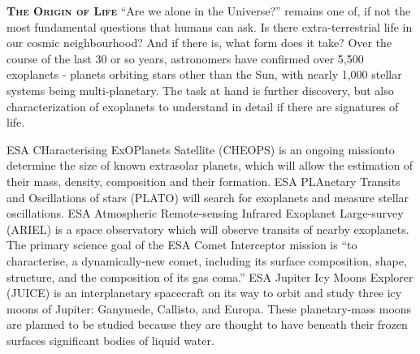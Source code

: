 \documentclass[a4paper,12pt]{article}
\begin{document}
\smallskip
\smallskip
\noindent
{\bfseries \textsc{\textcolor{Cerulean}{The Origin of Life}}}
``Are we alone in the Universe?'' remains one of, if not the most fundamental
questions that humans can ask. Is there
extra-terrestrial life in our cosmic neighbourhood? And if there is,
what form does it take?  Over the course of the last 30 or so years,
astronomers have confirmed over 5,500 exoplanets - planets orbiting
stars other than the Sun, with nearly 1,000 stellar systems being
multi-planetary.  The task at hand is further discovery, but also
characterization of exoplanets to understand in detail if there are
signatures of life.

\smallskip
ESA CHaracterising ExOPlanets Satellite (CHEOPS) is an ongoing missionto determine the size of known extrasolar planets, which will allow the estimation of their mass, density, composition and their formation. 
ESA PLAnetary Transits and Oscillations of stars (PLATO) will search
for exoplanets and measure stellar oscillations.  ESA Atmospheric
Remote-sensing Infrared Exoplanet Large-survey (ARIEL) is a space
observatory which will observe transits of nearby exoplanets.  The
primary science goal of the ESA Comet Interceptor mission is ``to
characterise, a dynamically-new comet, including its surface
composition, shape, structure, and the composition of its gas coma.''
ESA  Jupiter Icy Moons Explorer (JUICE) is an interplanetary spacecraft on its way to orbit and study three icy moons of Jupiter: Ganymede, Callisto, and Europa. These planetary-mass moons are planned to be studied because they are thought to have beneath their frozen surfaces significant bodies of liquid water. 
\end{document}
